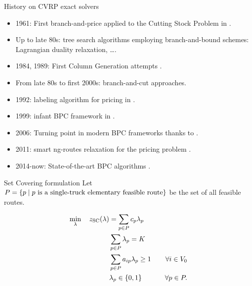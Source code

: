 \begin{frame}{History on CVRP exact solvers}
	\begin{itemize}
		\item 1961: First branch-and-price applied to the Cutting Stock Problem in \cite{gilmore1961}.
		\item Up to late 80s: tree search algorithms employing branch-and-bound schemes: Lagrangian duality relaxation, \dots.
		\item 1984, 1989: First Column Generation attempts \parencite{desrosiers1984, agarwal1989setpartitioningbased}.
		\item From late 80s to first 2000s: branch-and-cut approaches.
		\item 1992: labeling algorithm for pricing in \cite{desrochers1992}.
		\item 1999: infant BPC framework in \cite{kohl1999}.
		\item 2006: Turning point in modern BPC frameworks thanks to \parencite{fukasawa2006}.
		\item 2011: smart ng-routes relaxation for the pricing problem \parencite{baldacci2011}.
		\item 2014-now: State-of-the-art BPC algorithms \parencite{contardo2014,pecin2017improved,pecin2017new,pessoa2020,sadykov2021,pessoa2020generic}.
	\end{itemize}
\end{frame}

\begin{frame}{Set Covering formulation}
	Let $P = \Set*{p \mid p\ \text{is a single-truck elementary feasible route}}$ be the set of all feasible routes.

	\begin{align}
		\min_{\lambda} \quad z_\mt{SC}(\lambda) & = \sum_{p \in P}  c_p \lambda_p              & \label{eq:set-covering-obj-func}                                                       \\
		                                        & \sum_{p \in P} \lambda_{p} = K               & \label{eq:set-covering-K-routes}                                                       \\
		                                        & \sum_{p \in P}  a_{ip} \lambda_p \ge 1       & \quad \forall i \in V_0 \label{eq:set-covering-customers-visited-by-exactly-one-route} \\
		                                        & \lambda_p                    \in \Set*{0, 1} & \quad \forall p \in P \label{eq:set-covering-lambda-mip-var-bounds}.
	\end{align}
\end{frame}

